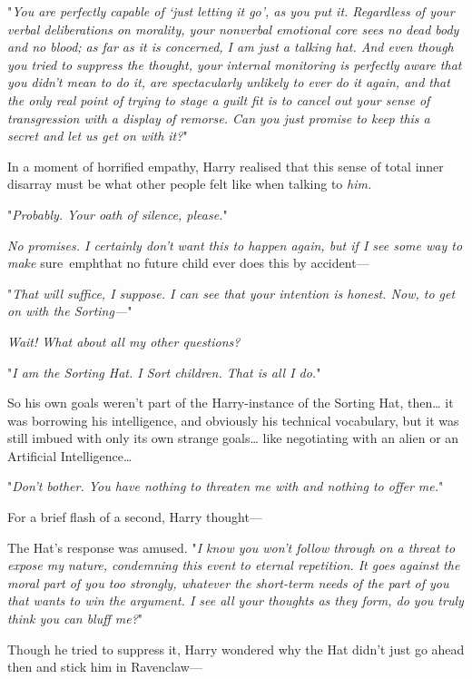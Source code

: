 "\emph{You are perfectly capable of `just letting it go', as you put it. 
Regardless of your verbal deliberations on morality, your nonverbal emotional 
core sees no dead body and no blood; as far as it is concerned, I am just a 
talking hat. And even though you tried to suppress the thought, your internal 
monitoring is perfectly aware that you didn't mean to do it, are spectacularly 
unlikely to ever do it again, and that the only real point of trying to stage a 
guilt fit is to cancel out your sense of transgression with a display of 
remorse. Can you just promise to keep this a secret and let us get on with it?}"

In a moment of horrified empathy, Harry realised that this sense of total inner 
disarray must be what other people felt like when talking to \emph{him.}

"\emph{Probably. Your oath of silence, please.}"

\emph{No promises. I certainly don't want this to happen again, but if I see 
some way to make} sure\ emph{that no future child ever does this by accident---}

"\emph{That will suffice, I suppose. I can see that your intention is honest. 
Now, to get on with the Sorting---}"

\emph{Wait! What about all my other questions?}

"\emph{I am the Sorting Hat. I Sort children. That is all I do.}"

So his own goals weren't part of the Harry-instance of the Sorting Hat, 
then{\ldots} it was borrowing his intelligence, and obviously his technical 
vocabulary, but it was still imbued with only its own strange goals{\ldots} 
like negotiating with an alien or an Artificial Intelligence{\ldots}

"\emph{Don't bother. You have nothing to threaten me with and nothing to offer 
me.}"

For a brief flash of a second, Harry thought---

The Hat's response was amused. "\emph{I know you won't follow through on a 
threat to expose my nature, condemning this event to eternal repetition. It 
goes against the moral part of you too strongly, whatever the short-term needs 
of the part of you that wants to win the argument. I see all your thoughts as 
they form, do you truly think you can bluff me?}"

Though he tried to suppress it, Harry wondered why the Hat didn't just go ahead 
then and stick him in Ravenclaw---

